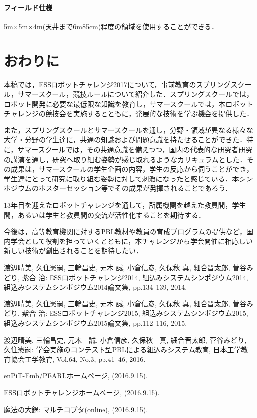 \documentclass[submit]{ipsj}
\begin{document}
\paragraph*{フィールド仕様}
5m×5m×4m(天井まで6m85cm)程度の領域を使用することができる．

\section{おわりに}

本稿では，ESSロボットチャレンジ2017について，事前教育のスプリングスクール，サマースクール，競技ルールについて紹介した．スプリングスクールでは，ロボット開発に必要な最低限な知識を教育し，サマースクールでは，本ロボットチャレンジの競技会を実施するとともに，発展的な技術を学ぶ機会を提供した．

また，スプリングスクールとサマースクールを通し，分野・領域が異なる様々な大学・分野の学生達に，共通の知識および問題意識を持たせることができた．特に，サマースクールでは，その共通意識を備えつつ，国内の代表的な研究者研究の講演を通し，研究へ取り組む姿勢が感じ取れるようなカリキュラムとした．その成果は，サマースクールの学生企画の内容，学生の反応から伺うことができ，学生達にとって研究に取り組む姿勢に対して刺激になったと感じている．本シンポジウムのポスターセッション等でその成果が発揮されることであろう．

13年目を迎えたロボットチャレンジを通して，所属機関を越えた教員間，学生間，あるいは学生と教員間の交流が活性化することを期待する．

今後は，高等教育機関に対するPBL教材や教員の育成プログラムの提供など，国内学会として役割を担っていくとともに，本チャレンジから学会開催に相応しい新しい技術が創出されることを期待したい．


\begin{thebibliography}{10}

 渡辺晴美, 久住憲嗣, 三輪昌史, 元木 誠, 小倉信彦, 久保秋 真, 細合晋太郎, 菅谷みどり, 紫合 治: ESSロボットチャレンジ2014, 組込みシステムシンポジウム2014, 組込みシステムシンポジウム2014論文集, pp.134--139, 2014.

	渡辺晴美, 久住憲嗣, 三輪昌史, 元木 誠, 小倉信彦, 久保秋 真, 細合晋太郎, 菅谷みどり, 紫合 治: ESSロボットチャレンジ2015, 組込みシステムシンポジウム2015, 組込みシステムシンポジウム2015論文集, pp.112--116, 2015.

 渡辺晴美, 三輪昌史, 元木　誠, 小倉信彦, 久保秋　真, 細合晋太郎, 菅谷みどり, 久住憲嗣: 学会実施のコンテスト型PBLによる組込みシステム教育, 日本工学教育協会工学教育, Vol.64, No.3, pp.41--46, 2016.

 enPiT-Emb/PEARLホームページ,  (2016.9.15).

 ESSロボットチャレンジホームページ,  (2016.9.15).

魔法の大鍋: マルチコプタ(online),
(2016.9.15).

\end{thebibliography}
\end{document}
